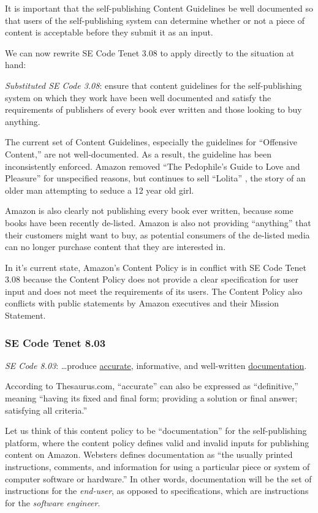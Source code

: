 \documentclass[11pt]{article}
\begin{document}
\begin{multicols}{2}
It is important that the self-publishing Content Guidelines be well documented so that users of the self-publishing system can determine whether or not a piece of content is acceptable before they submit it as an input.

We can now rewrite SE Code Tenet 3.08 to apply directly to the situation at hand:

\emph{Substituted SE Code 3.08}: ensure that content guidelines for the self-publishing system on which they work have been well documented and satisfy the requirements of publishers of every book ever written and those looking to buy anything.

The current set of Content Guidelines, especially the guidelines for ``Offensive Content,'' are not well-documented.  As a result, the guideline has been inconsistently enforced.  Amazon removed ``The Pedophile's Guide to Love and Pleasure'' for unspecified reasons, but continues to sell ``Lolita'' \cite{AmazonLolitaDTPListing}, the story of an older man attempting to seduce a 12 year old girl. 

Amazon is also clearly not publishing every book ever written, because some books have been recently de-listed.  Amazon is also not providing ``anything'' that their customers might want to buy, as potential consumers of the de-listed media can no longer purchase content that they are interested in.

In it's current state, Amazon's Content Policy is in conflict with SE Code Tenet 3.08 because the Content Policy does not provide a clear specification for user input and does not meet the requirements of its users.  The Content Policy also conflicts with public statements by Amazon executives and their Mission Statement.

\subsubsection{SE Code Tenet 8.03}

\emph{SE Code 8.03}: \ldots produce \underline{accurate}, informative, and well-written \underline{documentation}. 

According to Thesaurus.com, ``accurate'' can also be expressed as ``definitive,'' meaning ``having its fixed and final form; providing a solution or final answer; satisfying all criteria.'' \cite{Thesaurus, Dictionary}  

Let us think of this content policy to be ``documentation'' for the self-publishing platform, where the content policy defines valid and invalid inputs for publishing content on Amazon.  Websters defines documentation as ``the usually printed instructions, comments, and information for using a particular piece or system of computer software or hardware.'' \cite{WebsterOnlineDict} In other words, documentation will be the set of instructions for the \emph{end-user}, as opposed to specifications, which are instructions for the \emph{software engineer}. 


\end{multicols}
\end{document}
